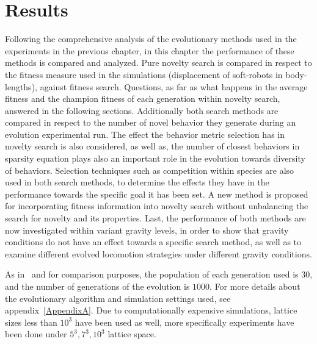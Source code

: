 
\chapter{Results} %

\label{Results} %


Following the comprehensive analysis of the evolutionary methods used in the experiments in the previous chapter, in this chapter the performance of these methods is compared and analyzed. Pure novelty search is compared in respect to the fitness measure used in the simulations (displacement of soft-robots in body-lengths), against fitness search. Questions, as far as what happens in the average fitness and the champion fitness of each generation within novelty search, answered in the following sections. Additionally both search methods are compared in respect to the number of novel behavior they generate during an evolution experimental run. The effect the behavior metric selection has in novelty search is also considered, as well as, the number of closest behaviors in sparsity equation plays also an important role in the evolution towards diversity of behaviors. Selection techniques such as competition within species are also used in both search methods, to determine the effects they have in the performance towards the specific goal it has been set. A new method is proposed for incorporating fitness information into novelty search without unbalancing the search for novelty and its properties. Last, the performance of both methods are now investigated within variant gravity levels, in order to show that gravity conditions do not have an effect towards a specific search method, as well as to examine different evolved locomotion strategies under different gravity conditions.

As in~\cite{cheney2013unshackling} and for comparison purposes, the population of each generation used is $30$, and the number of generations of the evolution is $1000$. For more details about the evolutionary algorithm and simulation settings used, see appendix~\ref{AppendixA}. Due to computationally expensive simulations, lattice sizes less than $10^3$ have been used as well, more specifically experiments have been done under $5^3, 7^3, 10^3$ lattice space.


